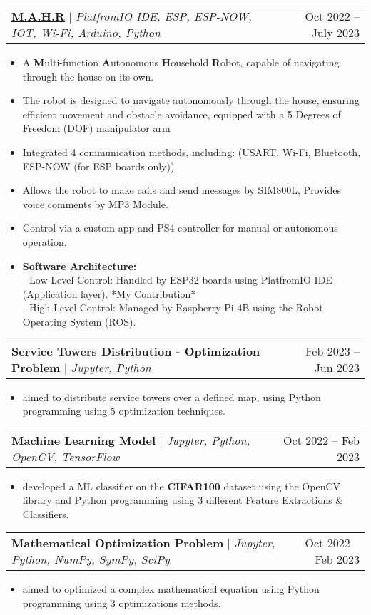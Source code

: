 \documentclass[letterpaper,11pt]{article}
\makeatletter
\newcommand{\resumeItem}[1]{
  \item\small{
    {#1 \vspace{-2pt}}
  }
}
\newcommand{\resumeProjectHeading}[2]{
    \item
    \begin{tabular*}{0.97\textwidth}{l@{\extracolsep{\fill}}r}
      \small#1 & #2 \\
    \end{tabular*}\vspace{-7pt}
}
\newcommand{\resumeItemListStart}{\begin{itemize}}
\newcommand{\resumeItemListEnd}{\end{itemize}\vspace{-5pt}}
\makeatother
\begin{document}
      \resumeProjectHeading
        {\textbf{\href{https://github.com/MostafaQusit/MAHR-GraduationProject}{M.A.H.R}} $|$ \emph{PlatfromIO IDE, ESP, ESP-NOW, IOT, Wi-Fi, Arduino, Python}}{Oct 2022 -- July 2023}
        \resumeItemListStart
          \resumeItem{A \textbf{M}ulti-function \textbf{A}utonomous \textbf{H}ousehold \textbf{R}obot, capable of navigating through the house on its own.}
          \resumeItem{The robot is designed to navigate autonomously through the house, ensuring efficient movement and obstacle avoidance, equipped with a 5 Degrees of Freedom (DOF) manipulator arm}
          
          \resumeItem{Integrated 4 communication methods, including: (USART, Wi-Fi, Bluetooth, ESP-NOW (for ESP boards only))}
          \resumeItem{Allows the robot to make calls and send messages by SIM800L, Provides voice comments by MP3 Module.}
          
          \resumeItem{Control via a custom app and PS4 controller for manual or autonomous operation.}          
          \resumeItem{\textbf{Software Architecture:}\\
          - Low-Level Control: Handled by ESP32 boards using PlatfromIO IDE (Application layer). *My Contribution*\\
          - High-Level Control: Managed by Raspberry Pi 4B using the Robot Operating System (ROS).}
        \resumeItemListEnd

      \resumeProjectHeading
        {\textbf{Service Towers Distribution - Optimization Problem} $|$ \emph{Jupyter, Python}}{Feb 2023 -- Jun 2023}
        \resumeItemListStart
          \resumeItem{aimed to distribute service towers over a defined map, using Python programming using 5 optimization techniques.}
        \resumeItemListEnd
      
      \resumeProjectHeading
        {\textbf{Machine Learning Model} $|$ \emph{Jupyter, Python, OpenCV, TensorFlow}}{Oct 2022 -- Feb 2023}
        \resumeItemListStart
          \resumeItem{developed a ML classifier on the \textbf{CIFAR100} dataset using the OpenCV library and Python programming using 3 different Feature Extractions \& Classifiers.}
        \resumeItemListEnd
          
      \resumeProjectHeading
        {\textbf{Mathematical Optimization Problem} $|$ \emph{Jupyter, Python, NumPy, SymPy, SciPy}}{Oct 2022 -- Feb 2023}
        \resumeItemListStart
          \resumeItem{aimed to optimized a complex mathematical equation using Python programming using 3 optimizations methods.}
        \resumeItemListEnd
\end{document}
